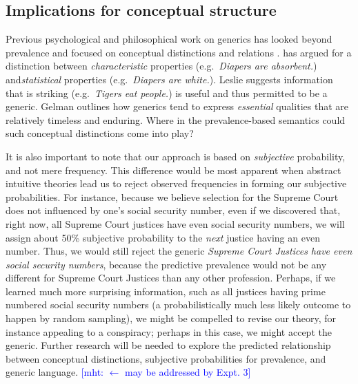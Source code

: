 \documentclass[12pt,letterpaper]{article}
\newcommand{\mht}[1]{\textcolor{Blue}{[mht: #1]}}
\begin{document}



\subsection*{Implications for conceptual structure}


Previous psychological and philosophical work on generics has looked beyond prevalence and focused on conceptual distinctions and relations \cite{Gelman2003,Prasada2013,Leslie2007,Leslie2008}. 
\citeauthor{Prasada2013} has argued for a distinction between \emph{characteristic} properties (e.g.~\emph{Diapers are absorbent.}) and\emph{statistical} properties (e.g.~\emph{Diapers are white.}).
Leslie suggests information that is striking (e.g.~\emph{Tigers eat people.}) is useful and thus permitted to be a generic.
Gelman outlines how generics tend to express \emph{essential} qualities that are relatively timeless and enduring. 
Where in the prevalence-based semantics could such conceptual distinctions come into play?

It is also important to note that our approach is based on \emph{subjective} probability, and not mere frequency.
This difference would be most apparent when abstract intuitive theories lead us to reject observed frequencies in forming our subjective probabilities. 
For instance, because we believe selection for the Supreme Court does not influenced by one's social security number, even if we discovered that, right now, all Supreme Court justices have even social security numbers, we will assign about 50\% subjective probability to the \emph{next} justice having an even number.
Thus, we would still reject the generic \emph{Supreme Court Justices have even social security numbers}, because the predictive prevalence would not be any different for Supreme Court Justices than any other profession. 
Perhaps, if we learned much more surprising information, such as all justices having prime numbered social security numbers (a probabilistically much less likely outcome to happen by random sampling), we might be compelled to revise our theory, for instance appealing to a conspiracy; perhaps in this case, we might accept the generic.
Further research will be needed to explore the predicted relationship between conceptual distinctions, subjective probabilities for prevalence, and generic language. \mht{$\leftarrow$ may be addressed by Expt. 3}
\end{document}
